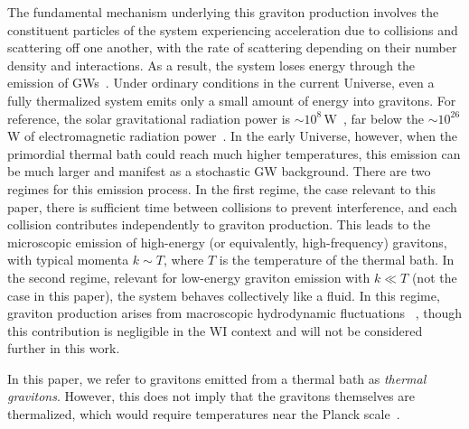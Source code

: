 \medskip
The fundamental mechanism underlying this graviton production involves the constituent particles of the system experiencing acceleration due to collisions and scattering off one another, with the rate of scattering depending on their number density and interactions. As a result, the system loses energy through the emission of GWs~\cite{Weinberg:1972kfs}. Under ordinary conditions in the current Universe, even a fully thermalized system emits only a small amount of energy into gravitons. For reference, the solar gravitational radiation power is $\sim 10^8\,\mathrm{W}$~\cite{Weinberg:1965nx,2024arXiv240718297G},
far below the $\sim 10^{26}$ W of electromagnetic radiation power~\cite{IAUInter-DivisionA-GWorkingGrouponNominalUnitsforStellarPlanetaryAstronomy:2015fjh}. In the early Universe, however, when the primordial thermal bath could reach much higher temperatures, this emission can be much larger and manifest as a stochastic GW background. There are two regimes for this emission process. In the first regime, the case relevant to this paper, there is sufficient time between collisions to prevent interference, and each collision contributes independently to graviton production. This leads to the microscopic emission of high-energy (or equivalently, high-frequency) gravitons, with typical momenta $k \sim T$, where $T$ is the temperature of the thermal bath. In the second regime, relevant for low-energy graviton emission with $k \ll T$ (not the case in this paper), the system behaves collectively like a fluid. In this regime, graviton production arises from macroscopic hydrodynamic fluctuations ~\cite{Weinberg:1972kfs, Ghiglieri:2015nfa, Ghiglieri:2020mhm},  though this contribution is negligible in the WI context and will not be considered further in this work.


In this paper, we refer to gravitons emitted from a thermal bath as {\it thermal gravitons}. However, this does not imply that the gravitons themselves are thermalized, which would require temperatures near the Planck scale~\cite{Kolb:1990vq}.

